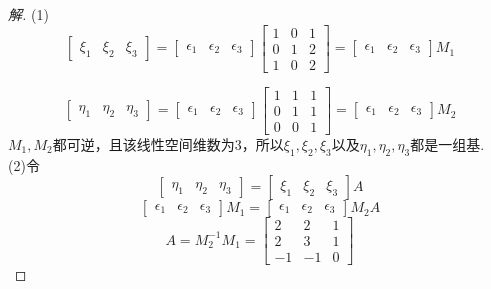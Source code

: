 \documentclass[10pt,a4paper]{report}
\begin{document}
\begin{proof}[解]
	(1)
	$$\left[
	\begin{matrix}
	\xi_{1} & \xi_{2} & \xi_{3}
	\end{matrix}
	\right] = \left[
	\begin{matrix}
	\epsilon_{1} & \epsilon_{2} & \epsilon_{3}
	\end{matrix}
	\right]\left[
	\begin{matrix}
	1 & 0 & 1\\
	0 & 1 & 2\\
	1 & 0 & 2
	\end{matrix}
	\right] = \left[
	\begin{matrix}
	\epsilon_{1} & \epsilon_{2} & \epsilon_{3}
	\end{matrix}
	\right]M_{1}$$
	
	$$\left[
	\begin{matrix}
	\eta_{1} & \eta_{2} & \eta_{3}
	\end{matrix}
	\right] = \left[
	\begin{matrix}
	\epsilon_{1} & \epsilon_{2} & \epsilon_{3}
	\end{matrix}
	\right]\left[
	\begin{matrix}
	1 & 1 & 1\\
	0 & 1 & 1\\
	0 & 0 & 1
	\end{matrix}
	\right] = \left[
	\begin{matrix}
	\epsilon_{1} & \epsilon_{2} & \epsilon_{3}
	\end{matrix}
	\right]M_{2}$$
	$M_{1},M_{2}$都可逆，且该线性空间维数为3，所以$\xi_{1} , \xi_{2} , \xi_{3}$以及$\eta_{1} , \eta_{2} , \eta_{3}$都是一组基.\\
	(2)令
	$$\left[
	\begin{matrix}
	\eta_{1} & \eta_{2} & \eta_{3}
	\end{matrix}
	\right] = \left[
	\begin{matrix}
	\xi_{1} & \xi_{2} & \xi_{3}
	\end{matrix}
	\right]A$$
	$$
	\left[
	\begin{matrix}
	\epsilon_{1} & \epsilon_{2} & \epsilon_{3}
	\end{matrix}
	\right]M_{1} = \left[
	\begin{matrix}
	\epsilon_{1} & \epsilon_{2} & \epsilon_{3}
	\end{matrix}
	\right]M_{2}A
	$$
	$$A = M_{2}^{-1}M_{1} = \left[
	\begin{matrix}
	2 & 2 & 1\\
	2 & 3 & 1\\
	-1 & -1 & 0
	\end{matrix}
	\right]$$
\end{proof}
\end{document}
